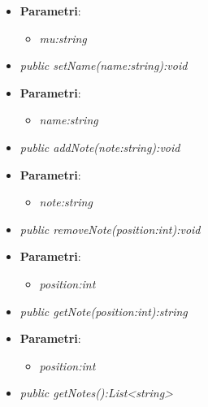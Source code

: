\begin{itemize}
\begin{itemize}
\begin{itemize}
				\item{\textbf{Parametri}: \begin{itemize}
				\item \textit{mu:string}\\

			\end{itemize}}
	\item \textit{public setName(name:string):void}\\
	
				\item{\textbf{Parametri}: \begin{itemize}
				\item \textit{name:string}\\

			\end{itemize}}

	\item \textit{public addNote(note:string):void}\\
	
				\item{\textbf{Parametri}: \begin{itemize}
				\item \textit{note:string}\\

			\end{itemize}}
	\item \textit{public removeNote(position:int):void}\\
	
				\item{\textbf{Parametri}: \begin{itemize}
				\item \textit{position:int}\\

			\end{itemize}}
	\item \textit{public getNote(position:int):string}\\
	
				\item{\textbf{Parametri}: \begin{itemize}
				\item \textit{position:int}\\

			\end{itemize}}
	\item \textit{public getNotes():List<string>}\\
	

\end{itemize}
\end{itemize}
\end{itemize}
